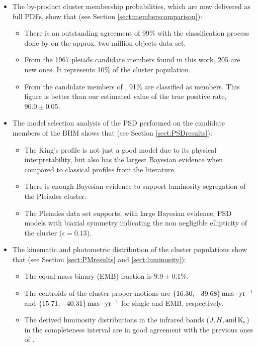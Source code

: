 \begin{itemize}
\item The by-product cluster membership probabilities, which are now delivered as full PDFs, show that (see Section \ref{sect:memberscomparison}):
\begin{itemize}
\item  There is an outstanding agreement of 99\% with the classification process done by \citet{Bouy2015} on the approx. two million objects data set.
\item From the 1967 pleiads candidate members found in this work, 205 are new ones. It represents 10\% of the cluster population. 
\item From the candidate members of \citet{Rebull2016}, 91\% are classified as members. This figure is better than our estimated value of the true positive rate, $ 90.0 \pm0.05$.
\end{itemize}
\item The model selection analysis of the PSD performed on the candidate members of the BHM shows that (see Section \ref{sect:PSDresults}):
\begin{itemize}
\item The King's profile \citep{King1962} is not just a good model due to its physical interpretability, but also has the largest Bayesian evidence when compared to classical profiles from the literature.
\item There is enough Bayesian evidence to support luminosity segregation of the Pleiades cluster.
\item The Pleiades data set supports, with large Bayesian evidence, PSD models with biaxial symmetry indicating the non negligible ellipticity of the cluster ($\epsilon=0.13$).
\end{itemize}
\item The kinematic and photometric distribution of the cluster populations show that (see Section \ref{sect:PMresults} and \ref{sect:luminosity}):
\begin{itemize}
\item The equal-mass binary (EMB) fraction is $9.9\pm0.1$\%.
\item The centroids of the cluster proper motions are $\{16.30,-39.68\}\,\rm{mas\cdot yr^{-1}}$ and $\{15.71,-40.31\}\,\rm{mas\cdot yr^{-1}}$ for single and EMB, respectively. 
\item The derived luminosity distributions in the infrared bands ($J,H, \rm{and} \,K_s$) in the completeness interval are in good agreement with the previous ones of \citet{Bouy2015}.

\end{itemize}
\end{itemize}
